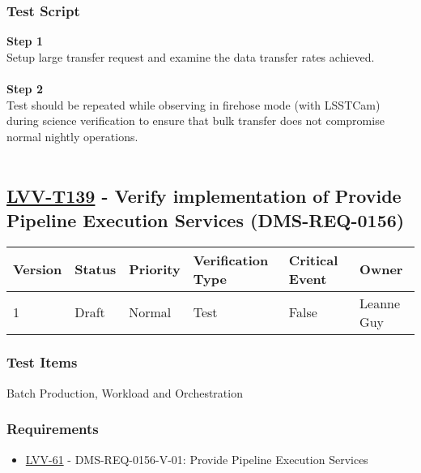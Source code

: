 \hypertarget{test-script-115}{%
\subsubsection{Test Script}\label{test-script-115}}

\textbf{Step 1}\\
Setup large transfer request and examine the data transfer rates
achieved.\\
~\\
\textbf{Step 2}\\
Test should be repeated while observing in firehose mode (with LSSTCam)
during science verification to ensure that bulk transfer does not
compromise normal nightly operations.\\
~\\

\hypertarget{lvv-t139---verify-implementation-of-provide-pipeline-execution-services-dms-req-0156}{%
\subsection{\texorpdfstring{\href{https://jira.lsstcorp.org/secure/Tests.jspa\#/testCase/LVV-T139}{LVV-T139}
- Verify implementation of Provide Pipeline Execution Services
(DMS-REQ-0156)}{LVV-T139 - Verify implementation of Provide Pipeline Execution Services (DMS-REQ-0156)}}\label{lvv-t139---verify-implementation-of-provide-pipeline-execution-services-dms-req-0156}}

\begin{longtable}[]{@{}llllll@{}}
\toprule
Version & Status & Priority & Verification Type & Critical Event &
Owner\tabularnewline
\midrule
\endhead
1 & Draft & Normal & Test & False & Leanne Guy\tabularnewline
\bottomrule
\end{longtable}

\hypertarget{test-items-115}{%
\subsubsection{Test Items}\label{test-items-115}}

Batch Production, Workload and Orchestration~

\hypertarget{requirements-116}{%
\subsubsection{Requirements}\label{requirements-116}}

\begin{itemize}
\tightlist
\item
  \href{https://jira.lsstcorp.org/browse/LVV-61}{LVV-61} -
  DMS-REQ-0156-V-01: Provide Pipeline Execution Services
\end{itemize}


